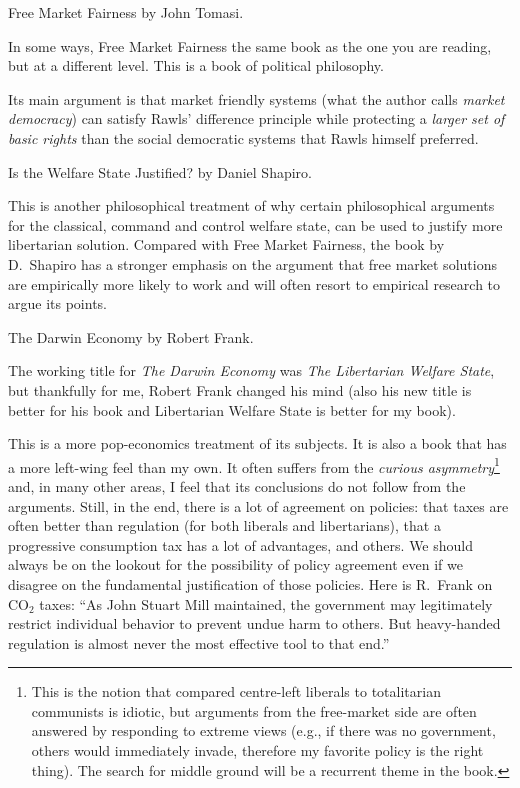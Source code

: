 \book Free Market Fairness by John Tomasi.

In some ways, Free Market Fairness the same book as the one you are reading,
but at a different level. This is a book of political philosophy.

Its main argument is that market friendly systems (what the author calls
\emph{market democracy}) can satisfy Rawls' difference principle while
protecting a \emph{larger set of basic rights} than the social democratic
systems that Rawls himself preferred.


\book Is the Welfare State Justified? by Daniel Shapiro.

This is another philosophical treatment of why certain philosophical arguments
for the classical, command and control welfare state, can be used to justify
more libertarian solution. Compared with Free Market Fairness, the book by D.\
Shapiro has a stronger emphasis on the argument that free market solutions are
empirically more likely to work and will often resort to empirical research to
argue its points.

\book The Darwin Economy by Robert Frank.

The working title for \emph{The Darwin Economy} was \emph{The Libertarian
Welfare State}, but thankfully for me, Robert Frank changed his mind (also his
new title is better for his book and Libertarian Welfare State is better for my
book).

This is a more pop-economics treatment of its subjects. It is also a book that
has a more left-wing feel than my own. It often suffers from the \emph{curious
asymmetry}\footnote{This is the notion that compared centre-left liberals to
totalitarian communists is idiotic, but arguments from the free-market side are
often answered by responding to extreme views (e.g., if there was no
government, others would immediately invade, therefore my favorite policy is
the right thing). The search for middle ground will be a recurrent theme in the
book.} and, in many other areas, I feel that its conclusions do not follow from
the arguments. Still, in the end, there is a lot of agreement on policies: that
taxes are often better than regulation (for both liberals and libertarians),
that a progressive consumption tax has a lot of advantages, and others. We
should always be on the lookout for the possibility of policy agreement even if
we disagree on the fundamental justification of those policies. Here is R.\ Frank
on CO$_2$ taxes: ``As John Stuart Mill maintained, the government may
legitimately restrict individual behavior to prevent undue harm to others. But
heavy-handed regulation is almost never the most effective tool to that end.''

